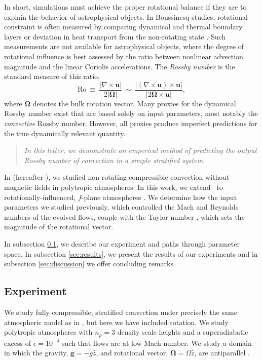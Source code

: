 In short, simulations must achieve the proper rotational balance if they are to explain 
the behavior of astrophysical objects. 
In Boussinesq studies, rotational constraint is often measured by comparing
dynamical and thermal boundary layers or deviation in heat transport from the non-rotating
state \cite{king&all2012, julien&all2012, king&all2013}. 
Such measurements are not available for astrophysical objects, where
the degree of rotational influence is best assessed by the ratio between 
nonlinear advection magnitude and the linear Coriolis accelerations. 
The \textit{Rossby number} is the standard measure of this ratio, 
\begin{equation}
\text{Ro} \ \equiv \ \frac{| \nabla \times \boldsymbol{u} | }{2 |\bm{\Omega}|} \ 
\sim \ \frac{| (\nabla \times \boldsymbol{u}) \times \boldsymbol{u}  | }{|2 \bm{\Omega} \times \boldsymbol{u}|},
\label{eqn:rossby-def}
\end{equation}
where $\bm{\Omega}$ denotes the bulk rotation vector. 
Many proxies for the dynamical Rossby number exist that are based solely on input parameters, most notably the \textit{convective} Rossby number. 
However, all proxies produce imperfect predictions for the true dynamically relevant quantity.
\begin{quote}
\emph{In this letter, we demonstrate an emperical method of predicting the output Rossby number
of convection in a simple stratified system.}
\end{quote}
In \cite{anders&brown2017} (hereafter \AB), we studied non-rotating compressible convection without magnetic fields in polytropic atmospheres. 
In this work, we extend \AB$\,$ to rotationally-influenced, $f$-plane
atmospheres 
\cite[e.g.,][]{brummell&all1996, brummell&all1998, calkins&all2015a}. 
We determine how the input parameters we studied previously, which controlled the Mach and
Reynolds numbers of the evolved flows, couple with the Taylor number \cite[Ta,][]{julien&all1996}, which sets the magnitude of the rotational vector. 

In subsection  \ref{sec:experiment}, we describe our experiment and paths through parameter space. 
In subsection \ref{sec:results}, we present the results of our experiments and in subsection \ref{sec:discussion} we offer concluding remarks.

\subsection{Experiment} 
\label{sec:experiment}
We study fully compressible, stratified 
convection under precisely the same atmospheric model
as in \AB, but here
we have included rotation. We study polytropic atmospheres
with $n_\rho = 3$ density scale heights and a superadiabatic
excess of $\epsilon = 10^{-4}$ such that flows are at low Mach number.
We study a domain in which the
gravity, $\bm{g} = -g\hat{z}$, and rotational vector, $\bm{\Omega} = \Omega \hat{z}$, 
are antiparallel \cite[as in e.g.,][]{julien&all1996, brummell&all1996}.

